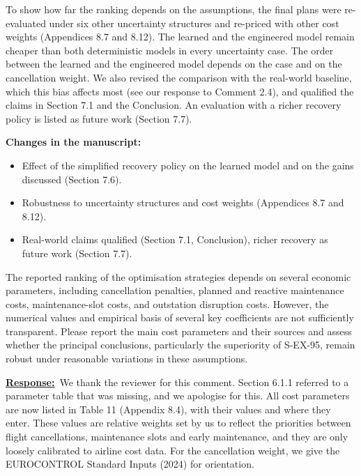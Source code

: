 \documentclass{article}
\newcommand{\response}{\vspace{0.1cm}\noindent\underline{\textbf{Response:}}\ }
\newcommand{\changes}{\vspace{0.1cm}\noindent\textbf{Changes in the manuscript:}}
\begin{document}
To show how far the ranking depends on the assumptions, the final plans were re-evaluated under six other uncertainty structures and re-priced with other cost weights (Appendices 8.7 and 8.12). The learned and the engineered model remain cheaper than both deterministic models in every uncertainty case. The order between the learned and the engineered model depends on the case and on the cancellation weight. We also revised the comparison with the real-world baseline, which this bias affects most (see our response to Comment 2.4), and qualified the claims in Section 7.1 and the Conclusion. An evaluation with a richer recovery policy is listed as future work (Section 7.7).

\changes
\begin{itemize}[nosep]
\item Effect of the simplified recovery policy on the learned model and on the gains discussed (Section 7.6).
\item Robustness to uncertainty structures and cost weights (Appendices 8.7 and 8.12).
\item Real-world claims qualified (Section 7.1, Conclusion), richer recovery as future work (Section 7.7).
\end{itemize}

\begin{cmt}{}{}
The reported ranking of the optimisation strategies depends on several economic parameters, including cancellation penalties, planned and reactive maintenance costs, maintenance-slot costs, and outstation disruption costs. However, the numerical values and empirical basis of several key coefficients are not sufficiently transparent. Please report the main cost parameters and their sources and assess whether the principal conclusions, particularly the superiority of S-EX-95, remain robust under reasonable variations in these assumptions.
\end{cmt}

\response We thank the reviewer for this comment. Section 6.1.1 referred to a parameter table that was missing, and we apologise for this. All cost parameters are now listed in Table 11 (Appendix 8.4), with their values and where they enter. These values are relative weights set by us to reflect the priorities between flight cancellations, maintenance slots and early maintenance, and they are only loosely calibrated to airline cost data. For the cancellation weight, we give the EUROCONTROL Standard Inputs (2024) for orientation.
\end{document}

